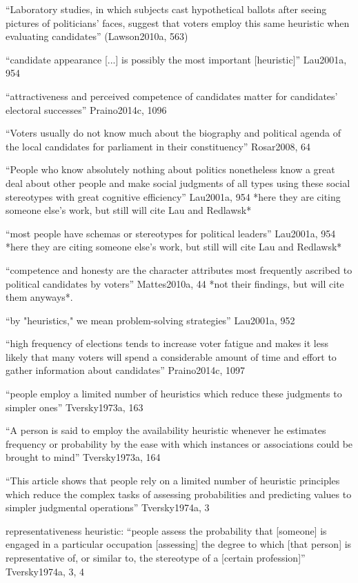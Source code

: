 ``Laboratory studies, in which subjects cast hypothetical ballots after seeing pictures of politicians' faces, suggest that voters employ this same heuristic when evaluating candidates'' (Lawson2010a, 563)

``candidate appearance [...] is possibly the most important [heuristic]'' Lau2001a, 954

``attractiveness and perceived competence of candidates matter for candidates’ electoral successes'' Praino2014c, 1096

``Voters usually do not know much about the biography and political agenda of the local candidates for parliament in their constituency'' Rosar2008, 64

``People who know absolutely nothing about politics nonetheless know a great deal about other people and make social judgments of all types using these social stereotypes with great cognitive efficiency'' Lau2001a, 954 *here they are citing someone else's work, but still will cite Lau and Redlawsk*

``most people have schemas or stereotypes for political leaders'' Lau2001a, 954 *here they are citing someone else's work, but still will cite Lau and Redlawsk*

``competence and honesty are the character attributes most frequently ascribed to political candidates by voters'' Mattes2010a, 44 *not their findings, but will cite them anyways*.

``by "heuristics," we mean problem-solving strategies'' Lau2001a, 952

``high frequency of elections tends to increase voter fatigue and makes it less likely that many voters will spend a considerable amount of time and effort to gather information about candidates'' Praino2014c, 1097

``people employ a limited number of heuristics which reduce these judgments to simpler ones'' Tversky1973a, 163

``A person is said to employ the availability heuristic whenever he estimates frequency or probability by the ease with which instances or associations could be brought to mind'' Tversky1973a, 164

``This article shows that people rely on a limited number of heuristic principles which reduce the complex tasks of assessing probabilities and predicting values to simpler judgmental operations'' Tversky1974a, 3

representativeness heuristic: ``people assess the probability that [someone] is engaged in a particular occupation [assessing] the degree to which [that person] is representative of, or similar to, the stereotype of a [certain profession]'' Tversky1974a, 3, 4

